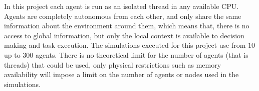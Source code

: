 In this project each agent is run as an isolated thread in any available CPU. Agents are completely autonomous from each other, and only share the same information about the environment around them, which means that, there is no access to global information, but only the local context is available to  decision making and task execution. The simulations executed for this project use from $10$ up to $300$ agents. There is no theoretical limit for the number of agents (that is threads) that could be used, only physical restrictions such as memory availability will impose a limit on the number of agents or nodes used in the simulations.